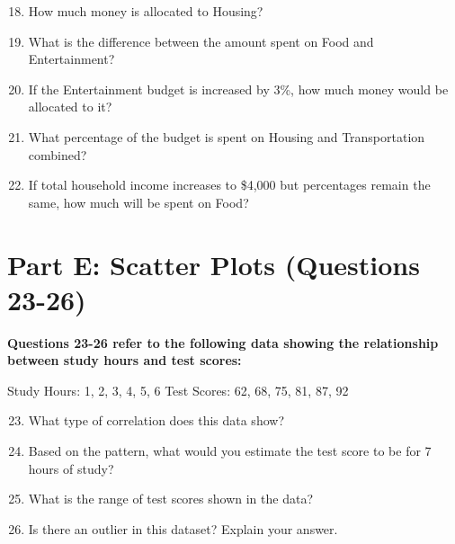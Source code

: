 \documentclass[12pt]{article}
\begin{document}
\begin{enumerate}
\setcounter{enumi}{17}
\item How much money is allocated to Housing?
\vspace{0.8in}

\item What is the difference between the amount spent on Food and Entertainment?
\vspace{0.8in}

\item If the Entertainment budget is increased by 3\%, how much money would be allocated to it?
\vspace{0.8in}

\item What percentage of the budget is spent on Housing and Transportation combined?
\vspace{0.8in}

\item If total household income increases to \$4,000 but percentages remain the same, how much will be spent on Food?
\vspace{0.8in}
\end{enumerate}

\section*{Part E: Scatter Plots (Questions 23-26)}

\noindent\textbf{Questions 23-26 refer to the following data showing the relationship between study hours and test scores:}

\noindent Study Hours: 1, 2, 3, 4, 5, 6
\noindent Test Scores: 62, 68, 75, 81, 87, 92

\begin{enumerate}
\setcounter{enumi}{22}
\item What type of correlation does this data show?
\vspace{0.8in}

\item Based on the pattern, what would you estimate the test score to be for 7 hours of study?
\vspace{0.8in}

\item What is the range of test scores shown in the data?
\vspace{0.8in}

\item Is there an outlier in this dataset? Explain your answer.
\vspace{0.8in}
\end{enumerate}
\end{document}
